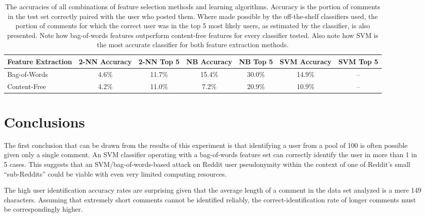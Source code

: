 \documentclass{article}
\begin{document}
\begin{table}
\begin{tabular}{l|c c c c c c}
Feature Extraction & 2-NN Accuracy & 2-NN Top 5 & NB Accuracy & NB Top 5 & SVM Accuracy & SVM Top 5 \\
\hline Bag-of-Words & 4.6\% & 11.7\% & 15.4\% & 30.0\% & 14.9\% & -- \\
\hline Content-Free & 4.2\% & 11.0\% & 7.2\% & 20.9\% & 10.9\% & -- \\
\end{tabular}
\caption{\label{tbl:results}
The accuracies of all combinations of feature selection methods and learning algorithms. Accuracy is the portion of comments in the test set correctly paired with the user who posted them. Where made possible by the off-the-shelf classifiers used, the portion of comments for which the correct user was in the top 5 most likely users, as estimated by the classifier, is also presented. Note how bag-of-words features outperform content-free features for every classifier tested. Also note how SVM is the most accurate classifier for both feature extraction methods.
}
\end{table}


\section{Conclusions}

The first conclusion that can be drawn from the results of this experiment is that identifying a user from a pool of 100 is often possible given only a single comment. An SVM classifier operating with a bag-of-words feature set can correctly identify the user in more than 1 in 5 cases. This suggests that an SVM/bag-of-words-based attack on Reddit user pseudonymity within the context of one of Reddit's small ``sub-Reddits'' could be viable with even very limited computing resources.

The high user identification accuracy rates are surprising given that the average length of a comment in the data set analyzed is a mere 149 characters. Assuming that extremely short comments cannot be identified reliably, the correct-identification rate of longer comments must be correspondingly higher.
\end{document}
